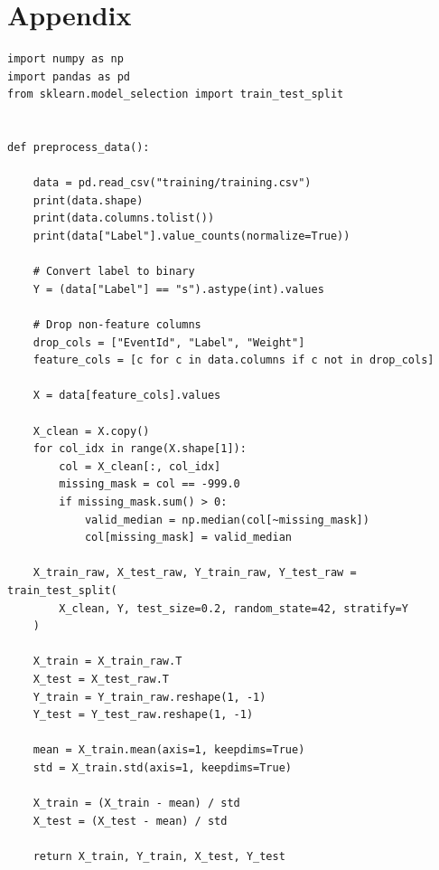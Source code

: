 \documentclass{article}
\begin{document}
\section{Appendix}
\begin{lstlisting}[caption={Preprocessing the Higgs data using preprocess\_data\_higgs.py}]
import numpy as np
import pandas as pd
from sklearn.model_selection import train_test_split


def preprocess_data():

    data = pd.read_csv("training/training.csv")
    print(data.shape)
    print(data.columns.tolist())
    print(data["Label"].value_counts(normalize=True))

    # Convert label to binary
    Y = (data["Label"] == "s").astype(int).values

    # Drop non-feature columns
    drop_cols = ["EventId", "Label", "Weight"]
    feature_cols = [c for c in data.columns if c not in drop_cols]

    X = data[feature_cols].values

    X_clean = X.copy()
    for col_idx in range(X.shape[1]):
        col = X_clean[:, col_idx]
        missing_mask = col == -999.0
        if missing_mask.sum() > 0:
            valid_median = np.median(col[~missing_mask])
            col[missing_mask] = valid_median

    X_train_raw, X_test_raw, Y_train_raw, Y_test_raw = train_test_split(
        X_clean, Y, test_size=0.2, random_state=42, stratify=Y
    )

    X_train = X_train_raw.T
    X_test = X_test_raw.T
    Y_train = Y_train_raw.reshape(1, -1)
    Y_test = Y_test_raw.reshape(1, -1)

    mean = X_train.mean(axis=1, keepdims=True)
    std = X_train.std(axis=1, keepdims=True)

    X_train = (X_train - mean) / std
    X_test = (X_test - mean) / std

    return X_train, Y_train, X_test, Y_test

\end{lstlisting}
\pagebreak
\end{document}

